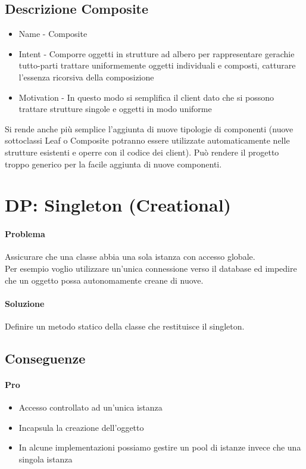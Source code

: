 \subsection*{Descrizione Composite}
\begin{itemize}
    \item Name - Composite
    \item Intent - Comporre oggetti in strutture ad albero per rappresentare gerachie tutto-parti
    trattare uniformemente oggetti individuali e composti, catturare l'essenza ricorsiva della
    composizione
    \item Motivation - In questo modo si semplifica il client dato che si possono trattare
    strutture singole e oggetti in modo uniforme
\end{itemize}
Si rende anche più semplice l'aggiunta di nuove tipologie di componenti (nuove sottoclassi Leaf
o Composite potranno essere utilizzate automaticamente nelle strutture esistenti e operre con il
codice dei client). Può rendere il progetto troppo generico per la facile aggiunta di nuove
componenti.
\section{DP: Singleton (Creational)}
\paragraph*{Problema} Assicurare che una classe abbia una sola istanza con accesso
globale. \\
Per esempio voglio utilizzare un'unica connessione verso il database ed impedire che un oggetto
possa autonomamente creane di nuove.
\paragraph*{Soluzione} Definire un metodo statico della classe che restituisce il singleton.
\subsection*{Conseguenze}
\paragraph*{Pro}
\begin{itemize}
    \item Accesso controllato ad un'unica istanza
    \item Incapsula la creazione dell'oggetto
    \item In alcune implementazioni possiamo gestire un pool di istanze invece che una singola
    istanza
\end{itemize}
